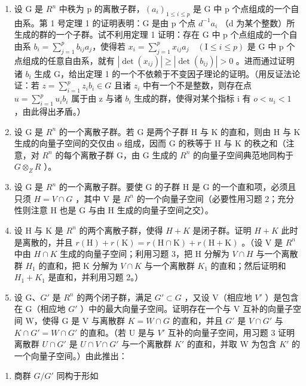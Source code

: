 \ExerciseSection

\begin{enumerate}
\def\labelenumi{\arabic{enumi})}
\item
  设 G 是 \(R^{n}\) 中秩为 p 的离散子群，\((a_{i})_{1\leqslant i\leqslant p}\) 是 G 中 p 个点组成的一个自由系。第 1 号定理 1 的证明表明：G 是由 p 个点 \(d^{-1}a_{i}\) （d 为某个整数）所生成的群的一个子群。试不利用定理 1 证明：存在 G 中 p 个点组成的一个自由系 \(b_{i}=\sum_{j=1}^{p}b_{ij}a_{j}\)，使得若 \(x_{i}=\sum_{j=1}^{p}x_{ij}a_{j}\quad(\mathrm{I}\leqslant i\leqslant p)\) 是 G 中 p 个点组成的任意自由系，就有 \(|\det(x_{ij})|\geqslant|\det(b_{ij})|>0\) 。进而通过证明诸 \(b_{i}\) 生成 G，给出定理 1 的一个不依赖于不变因子理论的证明。（用反证法论证：若 \(z=\sum_{i=1}^{p}z_{i}b_{i}\in G\) 且诸 \(z_{i}\) 中有一个不是整数，则存在点 \(u=\sum_{i=1}^{p}u_{i}b_{i}\) 属于由 z 与诸 \(b_{i}\) 生成的群，使得对某个指标 i 有 \(o<u_{i}<1\) ，由此得出矛盾。）
\item
  设 G 是 \(R^{n}\) 的一个离散子群。若 G 是两个子群 H 与 K 的直和，则由 H 与 K 生成的向量子空间的交仅由 o 组成，因而 G 的秩等于 H 与 K 的秩之和（注意，对 \(R^{n}\) 的每个离散子群 G，由 G 生成的 \(R^{n}\) 的向量子空间典范地同构于 \(G \otimes_{Z} R\) ）。
\item
  设 G 是 \(R^{n}\) 的一个离散子群。要使 G 的子群 H 是 G 的一个直和项，必须且只须 \(H = V \cap G\) ，其中 V 是 \(R^{n}\) 的一个向量子空间（必要性用习题 2；充分性则注意 H 也是 G 与由 H 生成的向量子空间之交）。
\item
  设 H 与 K 是 \(R^{n}\) 的两个离散子群，使得 \(H + K\) 是闭子群。证明 \(H + K\) 此时是离散的，并且 \(r(\mathrm{H}) + r(\mathrm{K}) = r(\mathrm{H} \cap \mathrm{K}) + r(\mathrm{H} + \mathrm{K})\) 。（设 V 是 \(R^{n}\) 中由 \(H \cap K\) 生成的向量子空间；利用习题 3，把 H 分解为 \(V \cap H\) 与一个离散群 \(H_{1}\) 的直和，把 K 分解为 \(V \cap K\) 与一个离散群 \(K_{1}\) 的直和；然后证明和 \(H_{1} + K_{1}\) 是直和，并利用习题 2。）
\item
  设 G、\(G'\) 是 \(R^{n}\) 的两个闭子群，满足 \(G' \subset G\) ，又设 V（相应地 \(V'\) ）是包含在 G（相应地 \(G'\) ）中的最大向量子空间。证明存在一个与 V 互补的向量子空间 W，使得 G 是 V 与离散群 \(K = W \cap G\) 的直和，并且 \(G'\) 是 \(V \cap G'\) 与 \(K \cap G' = W \cap G'\) 的直和。（若 U 是与 \(V'\) 互补的向量子空间，用习题 3 证明离散群 \(U \cap G'\) 是 \(U \cap V \cap G'\) 与一个离散群 \(K'\) 的直和，并取 W 为包含 \(K'\) 的一个向量子空间。）由此推出：
\end{enumerate}

\begin{enumerate}
\def\labelenumi{\alph{enumi})}
\tightlist
\item
  商群 \(G/G'\) 同构于形如
\end{enumerate}

